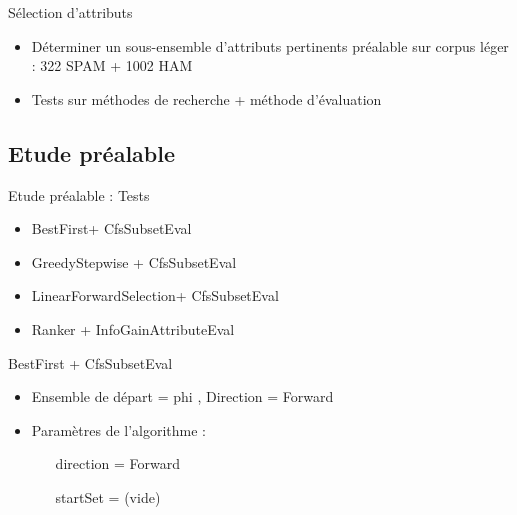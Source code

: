 \begin{frame} {Sélection d'attributs}
	\begin{itemize}
		\item Déterminer un sous-ensemble d'attributs pertinents 
		 préalable sur corpus léger : 322 SPAM + 1002 HAM
		\item Tests sur méthodes de recherche + méthode d'évaluation
	\end{itemize}
\end{frame}

\subsection{Etude préalable}
\begin{frame} {Etude préalable : Tests}
	\begin{itemize}
		\item BestFirst+ CfsSubsetEval
		\pause
		\item GreedyStepwise + CfsSubsetEval
		\pause
		\item LinearForwardSelection+ CfsSubsetEval
		\pause
		\item Ranker + InfoGainAttributeEval
	\end{itemize}
\end{frame}

\begin{frame} {BestFirst + CfsSubsetEval}
	\begin{itemize}
		\item Ensemble de départ = phi , Direction = Forward
		\item Paramètres de l'algorithme : 
			\begin{itemize}
				\item[direction] = Forward
				\item[startSet] = (vide)
			\end{itemize}
	\end{itemize}
\end{frame}

